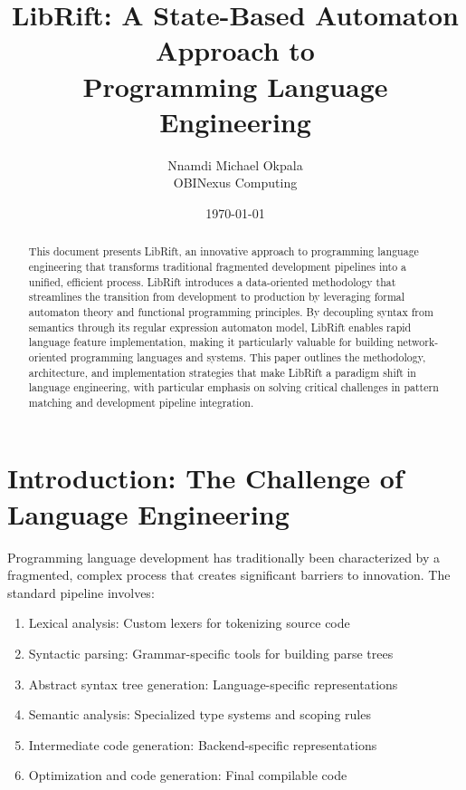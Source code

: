 \documentclass{article}
\title{LibRift: A State-Based Automaton Approach to\\Programming Language Engineering}
\author{Nnamdi Michael Okpala\\OBINexus Computing}
\date{\today}
\begin{document}
\maketitle

\begin{abstract}
This document presents LibRift, an innovative approach to programming language engineering that transforms traditional fragmented development pipelines into a unified, efficient process. LibRift introduces a data-oriented methodology that streamlines the transition from development to production by leveraging formal automaton theory and functional programming principles. By decoupling syntax from semantics through its regular expression automaton model, LibRift enables rapid language feature implementation, making it particularly valuable for building network-oriented programming languages and systems. This paper outlines the methodology, architecture, and implementation strategies that make LibRift a paradigm shift in language engineering, with particular emphasis on solving critical challenges in pattern matching and development pipeline integration.
\end{abstract}

\tableofcontents

\section{Introduction: The Challenge of Language Engineering}

Programming language development has traditionally been characterized by a fragmented, complex process that creates significant barriers to innovation. The standard pipeline involves:

\begin{enumerate}
    \item Lexical analysis: Custom lexers for tokenizing source code
    \item Syntactic parsing: Grammar-specific tools for building parse trees
    \item Abstract syntax tree generation: Language-specific representations
    \item Semantic analysis: Specialized type systems and scoping rules
    \item Intermediate code generation: Backend-specific representations
    \item Optimization and code generation: Final compilable code
\end{enumerate}
\end{document}
